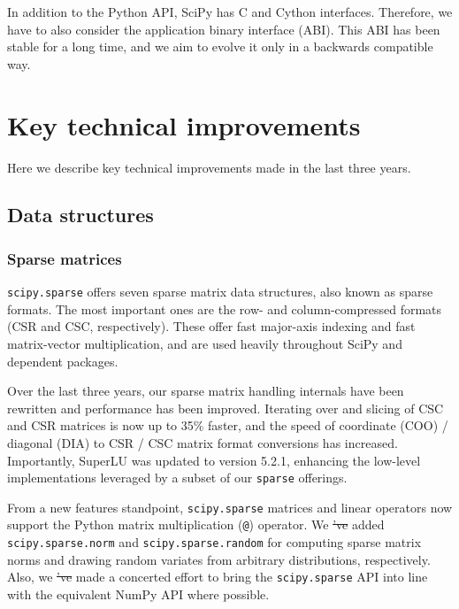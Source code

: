 \documentclass[fleqn,10pt]{wlscirep}
\providecommand{\DIFadd}[1]{{\protect\color{blue}\uwave{#1}}} %
\providecommand{\DIFdel}[1]{{\protect\color{red}\sout{#1}}}                      %
\providecommand{\DIFaddbegin}{} %
\providecommand{\DIFaddend}{} %
\providecommand{\DIFdelbegin}{} %
\providecommand{\DIFdelend}{} %
\begin{document}
In addition to the Python API, SciPy has C and Cython interfaces.
Therefore, we have to also consider the application binary
interface (ABI). This ABI has been stable for a long time, and we aim to
evolve it only in a backwards compatible way.

\section*{Key technical improvements}
\label{sec:technical_improvements}
Here we describe key technical improvements made in the last three years.

\subsection*{Data structures}

\subsubsection*{Sparse matrices}

\texttt{scipy.sparse} offers seven sparse matrix data structures,
also known as sparse formats. The most important ones are the row-
and column-compressed formats (CSR and CSC, respectively).
These offer fast major-axis indexing and fast matrix-vector multiplication,
and are used heavily throughout SciPy and dependent packages.

Over the last three years, our sparse matrix handling internals have been
rewritten and performance has been improved. Iterating over and slicing of CSC
and CSR matrices is now up to 35\% faster, 
and the speed of coordinate (COO) / diagonal (DIA) to CSR / CSC matrix format
conversions has increased. 
Importantly,
SuperLU\cite{superlu_ug99} was updated to version 5.2.1, enhancing the
low-level implementations leveraged by a subset of our \texttt{sparse}
offerings.

From a new features standpoint, \texttt{scipy.sparse} matrices and linear
operators now support the Python matrix multiplication (\texttt{@}) operator.
We \DIFdelbegin \DIFdel{'ve }\DIFdelend \DIFaddbegin \DIFadd{have }\DIFaddend added \texttt{scipy.sparse.norm} and
\texttt{scipy.sparse.random} for computing sparse matrix norms and drawing
random variates from arbitrary distributions, respectively. Also, we \DIFdelbegin \DIFdel{'ve }\DIFdelend \DIFaddbegin \DIFadd{have }\DIFaddend made a
concerted effort to bring the \texttt{scipy.sparse} API into line with the
equivalent NumPy API where possible.
\end{document}
